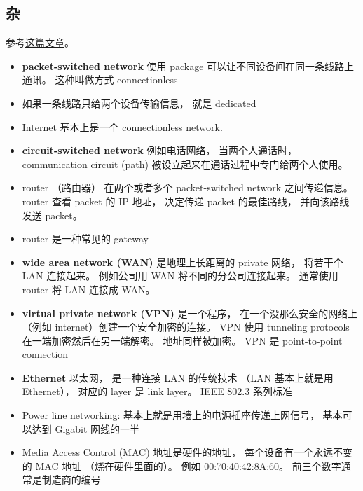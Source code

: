 \subsection{杂}
参考\href{https://www.cnet.com/how-to/home-networking-explained-part-1-heres-the-url-for-you/}{这篇文章}。
\begin{itemize}
\item \textbf{packet-switched network} 使用 package 可以让不同设备间在同一条线路上通讯。 这种叫做方式 connectionless
\item 如果一条线路只给两个设备传输信息， 就是 dedicated
\item Internet 基本上是一个 connectionless network.
\item \textbf{circuit-switched network} 例如电话网络， 当两个人通话时， communication circuit (path) 被设立起来在通话过程中专门给两个人使用。
\item router （路由器） 在两个或者多个 packet-switched network 之间传递信息。 router 查看 packet 的 IP 地址， 决定传递 packet 的最佳路线， 并向该路线发送 packet。
\item router 是一种常见的 gateway
\item \textbf{wide area network (WAN)} 是地理上长距离的 private 网络， 将若干个 LAN 连接起来。 例如公司用 WAN 将不同的分公司连接起来。 通常使用 router 将 LAN 连接成 WAN。
\item \textbf{virtual private network (VPN)} 是一个程序， 在一个没那么安全的网络上（例如 internet）创建一个安全加密的连接。 VPN 使用 tunneling protocols 在一端加密然后在另一端解密。 地址同样被加密。 VPN 是 point-to-point connection
\item \textbf{Ethernet} 以太网， 是一种连接 LAN 的传统技术 （LAN 基本上就是用 Ethernet）， 对应的 layer 是 link layer。  IEEE 802.3 系列标准
\item Power line networking: 基本上就是用墙上的电源插座传递上网信号， 基本可以达到 Gigabit 网线的一半
\item Media Access Control (MAC) 地址是硬件的地址， 每个设备有一个永远不变的 MAC 地址 （烧在硬件里面的）。 例如 00:70:40:42:8A:60。 前三个数字通常是制造商的编号
\end{itemize}


